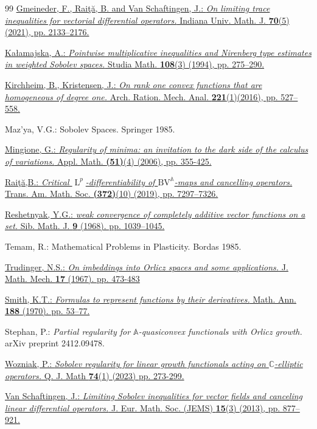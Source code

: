 \documentclass[a4paper,10pt,reqno,oneside]{amsart}
\numberwithin{equation}{section}
\newcommand{\C}{\mathbb C}
\newcommand{\Aop}{\mathbb{A}}
\newcommand{\lebe}{\operatorname{L}}
\newcommand{\BV}{\mathrm{BV}}
\begin{document}
\begin{thebibliography}{99}
 \href{https://doi.org/10.1512/iumj.2021.70.8682}{Gmeineder, F., Rai\c{t}\u{a}, B. and Van Schaftingen, J.: \textit{On limiting trace inequalities for vectorial differential operators.} Indiana Univ. Math. J. \textbf{70}(5) (2021), pp. 2133--2176.}

 \href{https://doi.org/10.4064/sm-108-3-275-290}{Ka\l{}amajska, A.: \textit{Pointwise multiplicative inequalities and Nirenberg type estimates in weighted Sobolev spaces.} Studia Math. \textbf{108}(3) (1994), pp. 275--290.}

\href{https://doi.org/10.1007/s00205-016-0967-1}{Kirchheim, B., Kristensen, J.: \textit{On rank one convex functions that are homogeneous of degree one.} Arch. Ration. Mech. Anal. \textbf{221}(1)(2016), pp. 527--558.}


 Maz'ya, V.G.: Sobolev Spaces. Springer 1985.

\href{https://doi.org/10.1007/s10778-006-0110-3}{Mingione, G.: \textit{Regularity of minima: an invitation to the dark side of the calculus of variations.} Appl. Math. \textbf{(51)}(4) (2006), pp. 355-425.}

\href{https://doi.org/10.1090/tran/7878}{Rai\c{t}\u{a},B.: \textit{Critical $\lebe^p$-differentiability of $\BV^\Aop$-maps and cancelling operators.} Trans. Am. Math. Soc. \textbf{(372)}(10) (2019), pp. 7297--7326.}

\href{https://doi.org/10.1007/BF02196453}{Reshetnyak, Y.G.: \textit{weak convergence of completely additive vector functions on a set.} Sib. Math. J. \textbf{9} (1968). pp. 1039--1045.}

 Temam, R.: Mathematical Problems in Plasticity. Bordas 1985.

 \href{https://www.jstor.org/stable/24901677?seq=1}{Trudinger, N.S.: \textit{On imbeddings into Orlicz spaces and some applications.} J. Math. Mech. \textbf{17} (1967). pp. 473-483}

 \href{https://doi.org/10.1007/BF01435415}{Smith, K.T.: \textit{Formulas to represent functions by their derivatives.} Math. Ann. \textbf{188} (1970). pp. 53--77.}

 Stephan, P.: \textit{Partial regularity for $\Aop$-quasiconvex functionals with Orlicz growth.} arXiv preprint 2412.09478.

\href{https://doi.org/10.1093/qmath/haac022}{Wozniak, P.: \textit{Sobolev regularity for linear growth functionals acting on $\C$-elliptic operators.} Q. J. Math \textbf{74}(1) (2023) pp. 273-299.}



 \href{https://doi.org/10.4171/JEMS/380}{Van Schaftingen, J.:  \textit{Limiting Sobolev inequalities for vector fields and canceling linear differential operators.} J. Eur. Math. Soc. (JEMS) \textbf{15}(3) (2013), pp. 877--921.}

\end{thebibliography}
\end{document}
